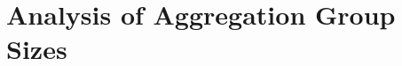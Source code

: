 \begin{comment}
\section{Analysis of Propagation Effects}

This must be updated if new propegation experiments are added

As mentioned in Section \ref{sec:PropagationPubModel}, we hypothesized that we could improve the overall classification accuracy of our system by publishing the aggregated models generated. In this section we present the effects of publishing method. Figure \ref{fig:RegRangeTestPubParty} shows the case where each group of peers only share the perturbed, aggregate model among themselves, while Figure \ref{fig:RegRangeTestPubAll} shows the results the model is sent to all existing peers. 

The most obvious effect of globally publishing models is that the standard deviation is much lower than the group publishing case. This is not surprising.

The truth is probably somewhere in the middle - we can't expect to easily publish models globally in all settings. Additionally, there might be situations were global publishing could be detrimental to real world performance - for instance, if there are strong geographical, temporal or demographic trends, it might be better to limit the amount of model sharing to suitable subsets.

\todo[inline]{Add figure to results that deal with comparing party vs all}

As the previous experiment indicates that publishing newly made models to as many peers as possible is better \todo{Add a reflection talking about why this makes sense.}, we performed an additional experiment to determine whether it in such a scenario would be better to perform many aggregations with fewer models included in each aggregate or performing few aggregations including many models. This was achieved by testing performance with a range of values. In the experiment, each peer can only participate in a single aggregation before reaching the limit set by the privacy guarantee. For example, given a set of 50 peers, a aggregation size of 25 can only publish two aggregated models.

\end{comment}

\section{Analysis of Aggregation Group Sizes}

